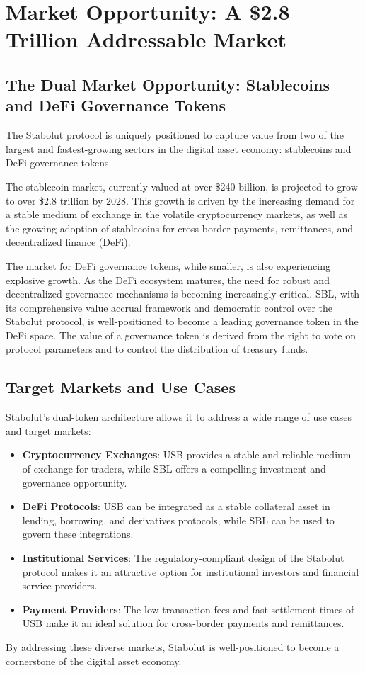 \section{Market Opportunity: A \$2.8 Trillion Addressable Market}

\subsection{The Dual Market Opportunity: Stablecoins and DeFi Governance Tokens}
The Stabolut protocol is uniquely positioned to capture value from two of the largest and fastest-growing sectors in the digital asset economy: stablecoins and DeFi governance tokens.

The stablecoin market, currently valued at over \$240 billion, is projected to grow to over \$2.8 trillion by 2028. This growth is driven by the increasing demand for a stable medium of exchange in the volatile cryptocurrency markets, as well as the growing adoption of stablecoins for cross-border payments, remittances, and decentralized finance (DeFi).

The market for DeFi governance tokens, while smaller, is also experiencing explosive growth. As the DeFi ecosystem matures, the need for robust and decentralized governance mechanisms is becoming increasingly critical. SBL, with its comprehensive value accrual framework and democratic control over the Stabolut protocol, is well-positioned to become a leading governance token in the DeFi space. The value of a governance token is derived from the right to vote on protocol parameters and to control the distribution of treasury funds.

\subsection{Target Markets and Use Cases}
Stabolut's dual-token architecture allows it to address a wide range of use cases and target markets:

\begin{itemize}
    \item \textbf{Cryptocurrency Exchanges}: USB provides a stable and reliable medium of exchange for traders, while SBL offers a compelling investment and governance opportunity.
    \item \textbf{DeFi Protocols}: USB can be integrated as a stable collateral asset in lending, borrowing, and derivatives protocols, while SBL can be used to govern these integrations.
    \item \textbf{Institutional Services}: The regulatory-compliant design of the Stabolut protocol makes it an attractive option for institutional investors and financial service providers.
    \item \textbf{Payment Providers}: The low transaction fees and fast settlement times of USB make it an ideal solution for cross-border payments and remittances.
\end{itemize}

By addressing these diverse markets, Stabolut is well-positioned to become a cornerstone of the digital asset economy.  